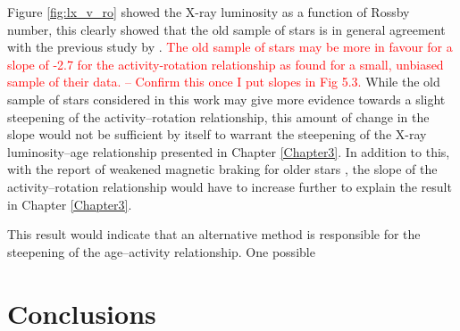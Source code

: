 Figure \ref{fig:lx_v_ro} showed the X-ray luminosity as a function of Rossby number, this clearly showed that the old sample of stars is in general agreement with the previous study by \citet{Wright_etal_2011}. \textcolor{red}{The old sample of stars may be more in favour for a slope of -2.7 for the activity-rotation relationship as \citet{Wright_etal_2011} found for a small, unbiased sample of their data. -- Confirm this once I put slopes in Fig 5.3.} While the old sample of stars considered in this work may give more evidence towards a slight steepening of the activity--rotation relationship, this amount of change in the slope would not be sufficient by itself to warrant the steepening of the X-ray luminosity--age relationship presented in Chapter \ref{Chapter3}. In addition to this, with the report of weakened magnetic braking for older stars \citep{van_Saders_etal_2016}, the slope of the activity--rotation relationship would have to increase further to explain the result in Chapter \ref{Chapter3}. 

This result would indicate that an alternative method is responsible for the steepening of the age--activity relationship. One possible 


























\section{Conclusions}


























